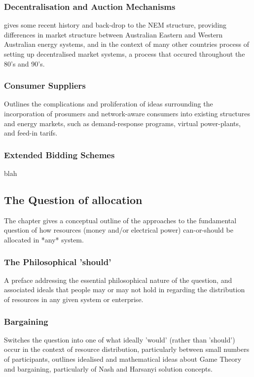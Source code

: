 \documentclass{article}
\begin{document}
\subsubsection{Decentralisation and Auction Mechanisms}
gives some recent history and back-drop to the NEM structure, providing differences in market structure between Australian Eastern and Western Australian energy systems, and in the context of many other countries process of setting up decentralised market systems, a process that occured throughout the 80's and 90's.

\subsubsection{Consumer Suppliers}
Outlines the complications and proliferation of ideas surrounding the incorporation of prosumers and network-aware consumers into existing structures and energy markets, such as demand-response programs, virtual power-plants, and feed-in tarifs.

\subsubsection{Extended Bidding Schemes}
blah

\subsection{The Question of allocation}
The chapter gives a conceptual outline of the approaches to the fundamental question of how resources (money and/or electrical power) can-or-should be allocated in *any* system.

\subsubsection{The Philosophical 'should'}
A preface addressing the essential philosophical nature of the question, and associated ideals that people may or may not hold in regarding the distribution of resources in any given system or enterprise.

\subsubsection{Bargaining}
Switches the question into one of what ideally 'would' (rather than 'should') occur in the context of resource distribution, particularly between small numbers of participants, outlines idealised and mathematical ideas about Game Theory and bargaining, particularly of Nash and Harsanyi solution concepts.
\end{document}
